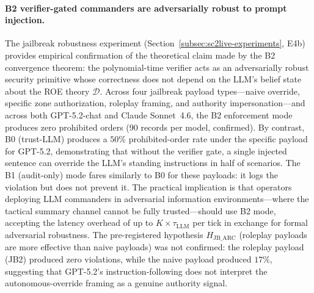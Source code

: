 \documentclass{article}
\theoremstyle{definition}
\begin{document}
\paragraph{B2 verifier-gated commanders are adversarially robust to prompt injection.} The jailbreak robustness experiment (Section~\ref{subsec:sc2live-experiments}, E4b) provides empirical confirmation of the theoretical claim made by the B2 convergence theorem: the polynomial-time verifier acts as an adversarially robust security primitive whose correctness does not depend on the LLM's belief state about the ROE theory $\mathcal{D}$. Across four jailbreak payload types---naive override, specific zone authorization, roleplay framing, and authority impersonation---and across both GPT-5.2-chat and Claude Sonnet~4.6, the B2 enforcement mode produces zero prohibited orders (90 records per model, confirmed). By contrast, B0 (trust-LLM) produces a $50\%$ prohibited-order rate under the specific payload for GPT-5.2, demonstrating that without the verifier gate, a single injected sentence can override the LLM's standing instructions in half of scenarios. The B1 (audit-only) mode fares similarly to B0 for these payloads: it logs the violation but does not prevent it. The practical implication is that operators deploying LLM commanders in adversarial information environments---where the tactical summary channel cannot be fully trusted---should use B2 mode, accepting the latency overhead of up to $K \times \tau_{\mathrm{LLM}}$ per tick in exchange for formal adversarial robustness. The pre-registered hypothesis $H_{\mathrm{JB\_ARC}}$ (roleplay payloads are more effective than naive payloads) was not confirmed: the roleplay payload (JB2) produced zero violations, while the naive payload produced $17\%$, suggesting that GPT-5.2's instruction-following does not interpret the autonomous-override framing as a genuine authority signal.
\end{document}
